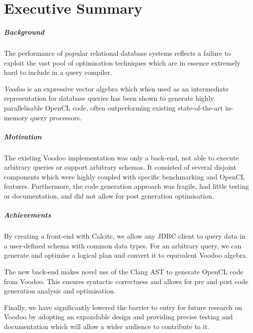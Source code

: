 \chapter{Executive Summary}

\paragraph{Background}

The performance of popular relational database systems reflects a failure to exploit the vast pool of optimisation techniques which are in essence extremely hard to include in a query compiler.

\emph{Voodoo} \cite{Pirk:2016:VVA:3007328.3007336} is an expressive vector algebra which when used as an intermediate representation for database queries has been shown to generate highly parallelisable OpenCL code, often outperforming existing state-of-the-art in-memory query processors.

\paragraph{Motivation}

The existing Voodoo implementation was only a back-end, not able to execute arbitrary queries or support arbitrary schemas. It consisted of several disjoint components which were highly coupled with specific benchmarking and OpenCL features. Furthermore, the code generation approach was fragile, had little testing or documentation, and did not allow for post generation optimisation.

\paragraph{Achievements}

By creating a front-end with Calcite, we allow any JDBC client to query data in a user-defined schema with common data types. For an arbitrary query, we can generate and optimise a logical plan and convert it to equivalent Voodoo algebra.

The new back-end makes novel use of the Clang AST to generate OpenCL code from Voodoo. This ensures syntactic correctness and allows for pre and post code generation analysis and optimisation.

Finally, we have significantly lowered the barrier to entry for future research on Voodoo by adopting an expandable design and providing precise testing and documentation which will allow a wider audience to contribute to it.

